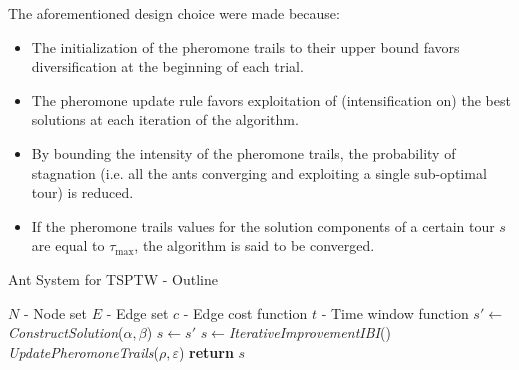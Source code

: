 \begin{homeworkProblem}
The aforementioned design choice were made because:

\begin{itemize}
    \item The initialization of the pheromone trails to their upper bound favors diversification at the beginning of each trial.
    \item The pheromone update rule favors exploitation of (intensification on) the best solutions at each iteration of the algorithm.
    \item By bounding the intensity of the pheromone trails, the probability of stagnation (i.e. all the ants converging and exploiting a single sub-optimal tour) is reduced.
    \item If the pheromone trails values for the solution components of a certain tour $s$ are equal to $\tau_{\max}$, the algorithm is said to be converged.
  \end{itemize}
  

\begin{algorithm}[!h]
  \caption{\maxmin Ant System for TSPTW - Outline}\label{maxmintsptw}
  \begin{algorithmic}[1]
    \Require $N$ - Node set
    \Require $E$ - Edge set 
    \Require $c$ - Edge cost function
    \Require $t$ - Time window function
        \State $s' \gets$ \emph{ConstructSolution}($\alpha,\beta$)
          \State $s \gets s' $
        \EndIf 
      \EndFor
      \State $s \gets$\emph{IterativeImprovementIBI}()
      \State \emph{UpdatePheromoneTrails}($\rho,\varepsilon$)
    \EndWhile
    \State \textbf{return} $s$
    \State
  \EndProcedure
\end{algorithmic}
\end{algorithm}

\begin{center}
  
\begin{minipage}{.45\textwidth}
\centering
{}
\end{minipage}
\end{center}
\end{homeworkProblem}
